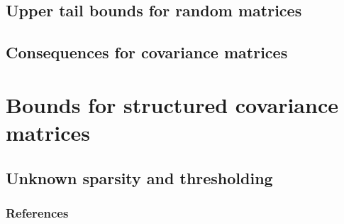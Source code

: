 \documentclass[10pt,handout,english]{beamer}
\begin{document}
\subsection{Upper tail bounds for random matrices}


\subsection{Consequences for covariance matrices}

\section{Bounds for structured covariance matrices}
\subsection{Unknown sparsity and thresholding}

\begin{frame}[allowframebreaks]
\frametitle{References}


\end{frame}
\end{document}
